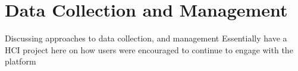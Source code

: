 \chapter{Data Collection and Management}
Discussing approaches to data collection, and management
Essentially have a HCI project here on how users were encouraged to continue to engage with the platform
